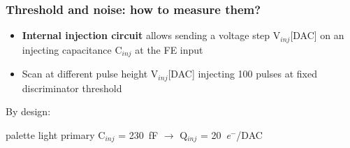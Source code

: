    \begin{frame}
        \frametitle{Threshold and noise: how to measure them?}
        \begin{itemize}
            \item\textbf{Internal injection circuit} allows sending a voltage step V$_{inj}$[DAC] on an injecting capacitance C$_{inj}$ at the FE input\\\medskip
            \item Scan at different pulse height V$_{inj}$[DAC] injecting 100 pulses at fixed discriminator threshold 
        \end{itemize}
        \medskip\medskip
        By design:
        \begin{beamercolorbox}[ rounded=true, center]{palette light primary}
            C$_{inj}$ = \SI{230}{fF} $\rightarrow$ Q$_{inj}$ = \SI{20}{\elementarycharge}$^-$/DAC
        \end{beamercolorbox}  
    \end{frame}


